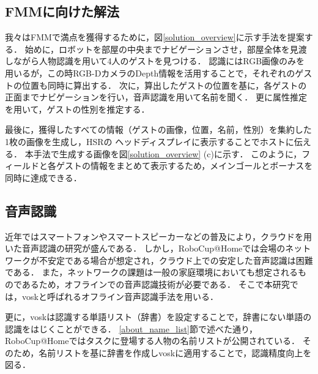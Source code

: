 \documentclass[a4j]{jarticle}
\begin{document}
\subsection{FMMに向けた解法}
我々はFMMで満点を獲得するために，図\ref{solution_overview}に示す手法を提案する．
始めに，ロボットを部屋の中央までナビゲーションさせ，部屋全体を見渡しながら人物認識を用いて4人のゲストを見つける．
認識にはRGB画像のみを用いるが，この時RGB-DカメラのDepth情報を活用することで，それぞれのゲストの位置も同時に算出する．
次に，算出したゲストの位置を基に，各ゲストの正面までナビゲーションを行い，音声認識を用いて名前を聞く．
更に属性推定を用いて，ゲストの性別を推定する．

最後に，獲得したすべての情報（ゲストの画像，位置，名前，性別）を集約した1枚の画像を生成し，HSRの
ヘッドディスプレイに表示することでホストに伝える．
本手法で生成する画像を図\ref{solution_overview} (c)に示す．
このように，フィールドと各ゲストの情報をまとめて表示するため，メインゴールとボーナスを同時に達成できる．


\subsection{音声認識}
近年ではスマートフォンやスマートスピーカーなどの普及により，クラウドを用いた音声認識の研究が盛んである\cite{google_speech_api, amazon_speech_api}．
しかし，RoboCup@Homeでは会場のネットワークが不安定である場合が想定され，クラウド上での安定した音声認識は困難である．
また，ネットワークの課題は一般の家庭環境においても想定されるものであるため，オフラインでの音声認識技術が必要である．
そこで本研究では，vosk\cite{vosk_hp}と呼ばれるオフライン音声認識手法を用いる．

更に，voskは認識する単語リスト（辞書）を設定することで，辞書にない単語の認識をはじくことができる．
\ref{about_name_list}節で述べた通り，RoboCup@Homeではタスクに登場する人物の名前リストが公開されている．
そのため，名前リストを基に辞書を作成しvoskに適用することで，認識精度向上を図る．
\end{document}
